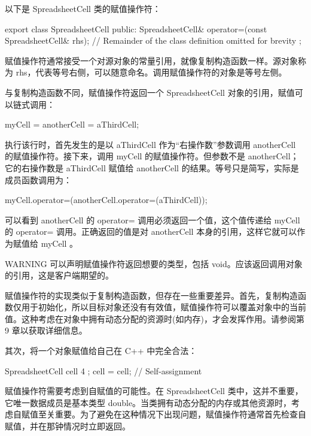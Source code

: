 
以下是 SpreadsheetCell 类的赋值操作符：

\begin{cpp}
export class SpreadsheetCell
{
    public:
        SpreadsheetCell& operator=(const SpreadsheetCell& rhs);
        // Remainder of the class definition omitted for brevity
};
\end{cpp}

赋值操作符通常接受一个对源对象的常量引用，就像复制构造函数一样。源对象称为 rhs，代表等号右侧，可以随意命名。调用赋值操作符的对象是等号左侧。

与复制构造函数不同，赋值操作符返回一个 SpreadsheetCell 对象的引用，赋值可以链式调用：

\begin{cpp}
myCell = anotherCell = aThirdCell;
\end{cpp}

执行该行时，首先发生的是以 aThirdCell 作为“右操作数”参数调用 anotherCell 的赋值操作符。接下来，调用 myCell 的赋值操作符。但参数不是 anotherCell；它的右操作数是 aThirdCell 赋值给 anotherCell 的结果。等号只是简写，实际是成员函数调用为：

\begin{cpp}
myCell.operator=(anotherCell.operator=(aThirdCell));
\end{cpp}

可以看到 anotherCell 的 operator= 调用必须返回一个值，这个值传递给 myCell 的 operator= 调用。正确返回的值是对 anotherCell 本身的引用，这样它就可以作为赋值给 myCell 。

\begin{myWarning}{WARNING}
可以声明赋值操作符返回想要的类型，包括 void。应该返回调用对象的引用，这是客户端期望的。
\end{myWarning}


赋值操作符的实现类似于复制构造函数，但存在一些重要差异。首先，复制构造函数仅用于初始化，所以目标对象还没有有效值，赋值操作符可以覆盖对象中的当前值。这种考虑在对象中拥有动态分配的资源时(如内存)，才会发挥作用。请参阅第 9 章以获取详细信息。

其次，将一个对象赋值给自己在 C++ 中完全合法：

\begin{cpp}
SpreadsheetCell cell { 4 };
cell = cell; // Self-assignment
\end{cpp}

赋值操作符需要考虑到自赋值的可能性。在 SpreadsheetCell 类中，这并不重要，它唯一数据成员是基本类型 double。当类拥有动态分配的内存或其他资源时，考虑自赋值至关重要。为了避免在这种情况下出现问题，赋值操作符通常首先检查自赋值，并在那钟情况时立即返回。

